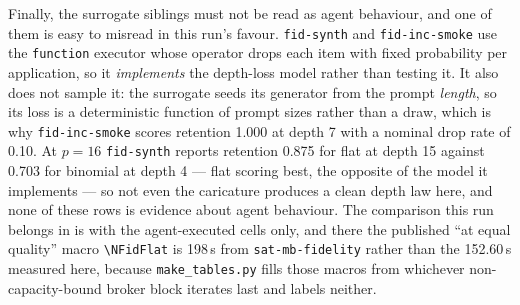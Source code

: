 \documentclass[11pt]{article}
\begin{document}
Finally, the surrogate siblings must not be read as agent behaviour, and one of them is
easy to misread in this run's favour. \texttt{fid-synth} and \texttt{fid-inc-smoke} use
the \texttt{function} executor whose operator drops each item with fixed probability per
application, so it \emph{implements} the depth-loss model rather than testing it. It also
does not sample it: the surrogate seeds its generator from the prompt \emph{length}, so
its loss is a deterministic function of prompt sizes rather than a draw, which is why
\texttt{fid-inc-smoke} scores retention 1.000 at depth 7 with a nominal drop rate of
0.10. At $p = 16$ \texttt{fid-synth} reports retention 0.875 for flat at depth 15 against
0.703 for binomial at depth 4 --- flat scoring best, the opposite of the model it
implements --- so not even the caricature produces a clean depth law here, and none of
these rows is evidence about agent behaviour. The comparison this run belongs in is with the agent-executed
cells only, and there the published ``at equal quality'' macro
\texttt{\textbackslash NFidFlat} is 198\,s from \texttt{sat-mb-fidelity} rather than the
152.60\,s measured here, because \texttt{make\_tables.py} fills those macros from
whichever non-capacity-bound broker block iterates last and labels neither.
\end{document}

